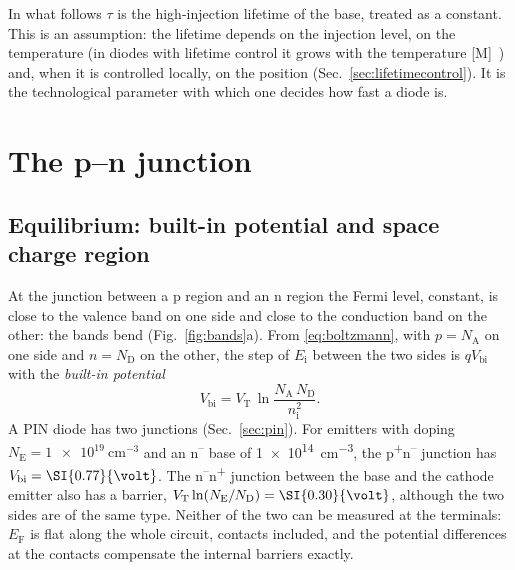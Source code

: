 \documentclass[10pt,a4paper]{scrartcl}
\newcommand{\VT}{V_\mathrm{T}}
\newcommand{\ND}{N_\mathrm{D}}
\newcommand{\NA}{N_\mathrm{A}}
\newcommand{\nint}{n_\mathrm{i}}
\newcommand{\Vbi}{V_\mathrm{bi}}
\newcommand{\Pp}{p\textsuperscript{+}}
\newcommand{\Nm}{n\textsuperscript{--}}
\newcommand{\Np}{n\textsuperscript{+}}
\begin{document}
In what follows $\tau$ is the high-injection lifetime of the base, treated as a constant. This is an assumption: the lifetime depends on the injection level, on the temperature (in diodes with lifetime control it grows with the temperature [M]~\cite{lutz}) and, when it is controlled locally, on the position (Sec.~\ref{sec:lifetimecontrol}). It is the technological parameter with which one decides how fast a diode is.

\section{The p--n junction}
\label{sec:junction}
\subsection{Equilibrium: built-in potential and space charge region}
\label{sec:equilibrium}
At the junction between a p region and an n region the Fermi level, constant, is close to the valence band on one side and close to the conduction band on the other: the bands bend (Fig.~\ref{fig:bands}a). From \eqref{eq:boltzmann}, with $p = \NA$ on one side and $n = \ND$ on the other, the step of $E_\mathrm{i}$ between the two sides is $q\Vbi$ with the \emph{built-in potential}
\begin{equation}
\Vbi = \VT\,\ln\frac{\NA\,\ND}{\nint^2} .
\label{eq:vbi}
\end{equation}
A PIN diode has two junctions (Sec.~\ref{sec:pin}). For emitters with doping $N_\mathrm{E} = \SI{1e19}{\centi\metre^{-3}}$ and an \Nm{} base of \SI{1e14}{\centi\metre^{-3}}, the \Pp\Nm{} junction has $\Vbi = \SI{\pdVbi}{\volt}$. The \Nm\Np{} junction between the base and the cathode emitter also has a barrier, $\VT\ln(N_\mathrm{E}/\ND) = \SI{\pdVbiTwo}{\volt}$, although the two sides are of the same type. Neither of the two can be measured at the terminals: $E_\mathrm{F}$ is flat along the whole circuit, contacts included, and the potential differences at the contacts compensate the internal barriers exactly.
\end{document}
